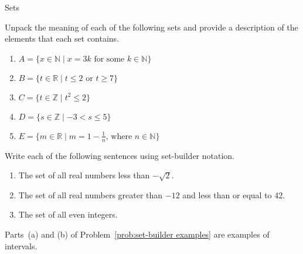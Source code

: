 \begin{section}{Sets}
\begin{problem}
Unpack the meaning of each of the following sets and provide a description of the elements that each set contains.
\begin{enumerate}[label=\textrm{(\alph*)}]
\item $A=\{x \in \mathbb{N} \mid x = 3k \mbox{ for some } k\in \mathbb{N} \}$
\item $B=\{t \in \mathbb{R} \mid t \leq 2 \mbox{ or } t\geq 7 \}$
\item $C=\{t \in \mathbb{Z} \mid t^2 \leq 2 \}$
\item $D=\{s \in \mathbb{Z} \mid -3<s\leq 5 \}$
\item $E=\{m \in \mathbb{R} \mid m = 1 - \frac{1}{n} \mbox{, where } n \in \mathbb{N} \}$
\end{enumerate}
\end{problem}

\begin{problem}\label{prob:set-builder examples}
Write each of the following sentences using set-builder notation.
\begin{enumerate}[label=\textrm{(\alph*)}]
\item\label{prob:set-builder examples a} The set of all real numbers less than $-\sqrt{2}$. 
\item\label{prob:set-builder examples b} The set of all real numbers greater than $-12$ and less than or equal to 42.
\item The set of all even integers.
\end{enumerate}
\end{problem}

Parts~(a) and (b) of Problem~\ref{prob:set-builder examples} are examples of intervals.


\end{section}
